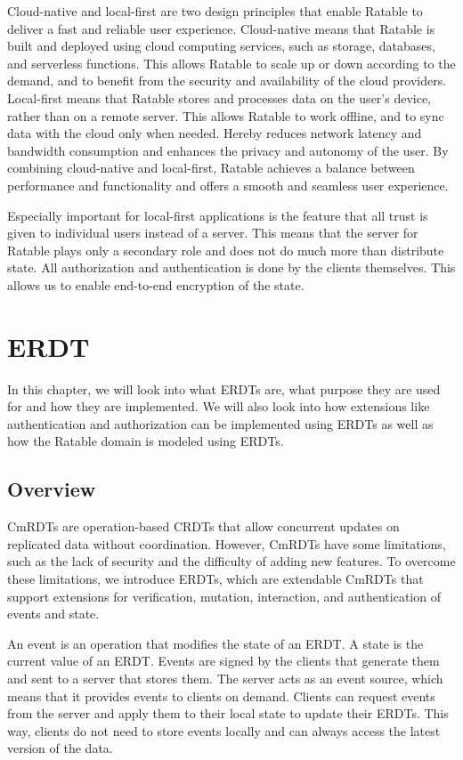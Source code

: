 \documentclass[
	english,
	ruledheaders=section,   %
	class=report,		    %
	thesis={type=bachelor}, %
	accentcolor=9c,			%
	custommargins=true,    %
	marginpar=false,        %
	parskip=half-,          %
	fontsize=11pt,          %
]{tudapub}
\begin{document}
Cloud-native and local-first are two design principles that enable Ratable to deliver a fast and reliable user experience. Cloud-native means that Ratable is built and deployed using cloud computing services, such as storage, databases, and serverless functions. This allows Ratable to scale up or down according to the demand, and to benefit from the security and availability of the cloud providers. Local-first means that Ratable stores and processes data on the user’s device, rather than on a remote server. This allows Ratable to work offline, and to sync data with the cloud only when needed. Hereby reduces network latency and bandwidth consumption and enhances the privacy and autonomy of the user. By combining cloud-native and local-first, Ratable achieves a balance between performance and functionality and offers a smooth and seamless user experience.

Especially important for local-first applications is the feature that all trust is given to individual users instead of a server. This means that the server for Ratable plays only a secondary role and does not do much more than distribute state. All authorization and authentication is done by the clients themselves. This allows us to enable end-to-end encryption of the state.

\chapter{ERDT}
In this chapter, we will look into what ERDTs are, what purpose they are used for and how they are implemented. We will also look into how extensions like authentication and authorization can be implemented using ERDTs as well as how the Ratable domain is modeled using ERDTs.

\section{Overview}
CmRDTs are operation-based CRDTs that allow concurrent updates on replicated data without coordination. However, CmRDTs have some limitations, such as the lack of security and the difficulty of adding new features. To overcome these limitations, we introduce ERDTs, which are extendable CmRDTs that support extensions for verification, mutation, interaction, and authentication of events and state.

An event is an operation that modifies the state of an ERDT. A state is the current value of an ERDT. Events are signed by the clients that generate them and sent to a server that stores them. The server acts as an event source, which means that it provides events to clients on demand. Clients can request events from the server and apply them to their local state to update their ERDTs. This way, clients do not need to store events locally and can always access the latest version of the data.
\end{document}
